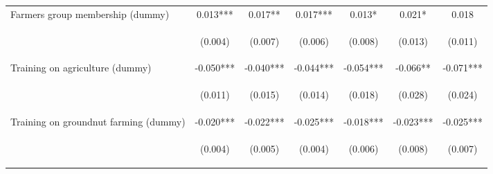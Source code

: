\begin{center}
\begin{tabular}{lcccccc}
Farmers group membership (dummy) & 0.013*** & 0.017** & 0.017*** & 0.013* & 0.021* & 0.018 \\
\vspace{4pt} & \begin{footnotesize}(0.004)\end{footnotesize} & \begin{footnotesize}(0.007)\end{footnotesize} & \begin{footnotesize}(0.006)\end{footnotesize} & \begin{footnotesize}(0.008)\end{footnotesize} & \begin{footnotesize}(0.013)\end{footnotesize} & \begin{footnotesize}(0.011)\end{footnotesize} \\
Training on agriculture (dummy) & -0.050*** & -0.040*** & -0.044*** & -0.054*** & -0.066** & -0.071*** \\
\vspace{4pt} & \begin{footnotesize}(0.011)\end{footnotesize} & \begin{footnotesize}(0.015)\end{footnotesize} & \begin{footnotesize}(0.014)\end{footnotesize} & \begin{footnotesize}(0.018)\end{footnotesize} & \begin{footnotesize}(0.028)\end{footnotesize} & \begin{footnotesize}(0.024)\end{footnotesize} \\
Training on groundnut farming (dummy) & -0.020*** & -0.022*** & -0.025*** & -0.018*** & -0.023*** & -0.025*** \\
\vspace{4pt} & \begin{footnotesize}(0.004)\end{footnotesize} & \begin{footnotesize}(0.005)\end{footnotesize} & \begin{footnotesize}(0.004)\end{footnotesize} & \begin{footnotesize}(0.006)\end{footnotesize} & \begin{footnotesize}(0.008)\end{footnotesize} & \begin{footnotesize}(0.007)\end{footnotesize} \\

\end{tabular}
\end{center}
